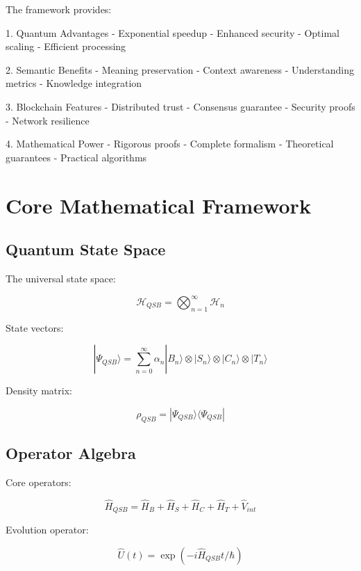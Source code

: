 \documentclass[12pt]{article}
\begin{document}
The framework provides:

1. Quantum Advantages
- Exponential speedup
- Enhanced security
- Optimal scaling
- Efficient processing

2. Semantic Benefits
- Meaning preservation
- Context awareness
- Understanding metrics
- Knowledge integration

3. Blockchain Features
- Distributed trust
- Consensus guarantee
- Security proofs
- Network resilience

4. Mathematical Power
- Rigorous proofs
- Complete formalism
- Theoretical guarantees
- Practical algorithms

\section{Core Mathematical Framework}

\subsection{Quantum State Space}

The universal state space:

\begin{equation}
\mathcal{H}_{QSB} = \bigotimes_{n=1}^{\infty} \mathcal{H}_n
\end{equation}

State vectors:

\begin{equation}
|\Psi_{QSB}\rangle = \sum_{n=0}^{\infty} \alpha_n|B_n\rangle \otimes |S_n\rangle \otimes |C_n\rangle \otimes |T_n\rangle
\end{equation}

Density matrix:

\begin{equation}
\rho_{QSB} = |\Psi_{QSB}\rangle\langle\Psi_{QSB}|
\end{equation}

\subsection{Operator Algebra}

Core operators:

\begin{equation}
\hat{H}_{QSB} = \hat{H}_B + \hat{H}_S + \hat{H}_C + \hat{H}_T + \hat{V}_{int}
\end{equation}

Evolution operator:

\begin{equation}
\hat{U}(t) = \exp(-i\hat{H}_{QSB}t/\hbar)
\end{equation}
\end{document}
